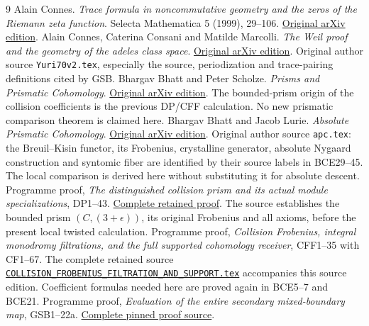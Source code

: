 \documentclass[11pt,a4paper]{article}
\begin{document}
\begin{thebibliography}{9}
 Alain Connes.
\emph{Trace formula in noncommutative geometry and the zeros of the
Riemann zeta function}. Selecta Mathematica 5 (1999), 29--106.
\href{https://arxiv.org/abs/math/9811068v1}{Original arXiv edition}.
 Alain Connes, Caterina Consani and Matilde Marcolli.
\emph{The Weil proof and the geometry of the adeles class space}.
\href{https://arxiv.org/abs/math/0703392v1}{Original arXiv edition}.
Original author source \texttt{Yuri70v2.tex}, especially the source,
periodization and trace-pairing definitions cited by GSB.
 Bhargav Bhatt and Peter Scholze.
\emph{Prisms and Prismatic Cohomology}.
\href{https://arxiv.org/abs/1905.08229v4}{Original arXiv edition}.
The bounded-prism origin of the collision coefficients is the
previous DP/CFF calculation. No new prismatic comparison theorem
is claimed here.
 Bhargav Bhatt and Jacob Lurie.
\emph{Absolute Prismatic Cohomology}.
\href{https://arxiv.org/abs/2201.06120v1}{Original arXiv edition}.
Original author source \texttt{apc.tex}: the Breuil--Kisin
functor, its Frobenius, crystalline generator, absolute
Nygaard construction and syntomic fiber are identified by
their source labels in BCE29--45. The local comparison
is derived here without substituting it for absolute descent.
 Programme proof,
\emph{The distinguished collision prism and its actual module
specializations}, DP1--43.
\href{https://github.com/KokunoYumeto/zeta-function-research-reader/blob/main/workbenches/splitzero-tandem/branches/tau-zero-prime-positivity/mixed-boundary-collision/collision_boundary/original_sources/DISTINGUISHED_COLLISION_PRISM_DERIVATION.md}
{Complete retained proof}. The source establishes the bounded
prism \((C,(3+\epsilon))\), its original Frobenius and all
axioms, before the present local twisted calculation.
 Programme proof,
\emph{Collision Frobenius, integral monodromy filtrations, and the
full supported cohomology receiver}, CFF1--35 with CF1--67.
The complete retained source
\href{https://github.com/KokunoYumeto/zeta-function-research-reader/blob/main/workbenches/splitzero-tandem/branches/tau-zero-prime-positivity/mixed-boundary-collision/collision_boundary/original_sources/COLLISION_FROBENIUS_FILTRATION_AND_SUPPORT.tex}
{\texttt{COLLISION\_FROBENIUS\_FILTRATION\_AND\_SUPPORT.tex}}
accompanies this source edition. Coefficient formulas needed here
are proved again in BCE5--7 and BCE21.
 Programme proof,
\emph{Evaluation of the entire secondary mixed-boundary map},
GSB1--22a.
\href{https://github.com/KokunoYumeto/zeta-function-research-reader/blob/7bb431df02b42681b3c7335fbf272a3771f777ef/workbenches/splitzero-tandem/research-self-audit/supporting_proofs/GLOBAL_SECONDARY_BOUNDARY_EVALUATION.tex}
{Complete pinned proof source}.
\end{thebibliography}
\end{document}
